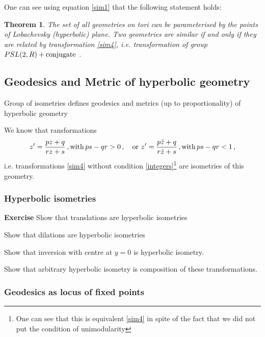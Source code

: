 \documentclass[12pt]{article}
\newtheorem{theorem}{Theorem}
\theoremstyle{definition}
\numberwithin{equation}{section}
\begin{document}
 One can see using equation \eqref{sim1}
that the following statement holds:


\begin{theorem}
The set of all geometries on tori 
can be parameterised by the points 
of Lobachevsky (hyperbolic) plane.
 Two geometries are similar if and only if
they are related by transformation
\eqref{sim4}, i.e. transformation of
 group $PSL(2,R)+{\rm conjugate}$ . 
\end{theorem}


\subsection {Geodesics and Metric of hyperbolic geometry}


  Group of isometries defines geodesics and metrics
(up to proportionality) of hyperbolic geometry

 We know that ransformations 
  \begin{equation}\label{hypisometry}
 z'={pz+q\over rz+s}\,,{\rm with}\,
      ps-qr>0\,,
   \quad {\rm or}\,\,
   z'={p\bar z+q\over r\bar z+s}\,,{\rm with}\,
      ps-qr<1\,,
 \end{equation}
i.e. transformations \eqref{sim4} without
condition \eqref{integers}\footnote{One can see that
this is equivalent \eqref{sim4} in spite of the fact that
we did not put the condition of unimodularity} 
are isometries of this geometry. 
\m

\subsubsection{Hyperbolic isometries}\label{exercises}


{\bf Exercise} Show that translations
are hyperbolic isometries


\smallskip

 Show that dilations 
are hyperbolic isometries


\smallskip


  Show that inversion with 
centre at $y=0$ is hyperbolic isometry. 


\smallskip

  Show that arbitrary
hyperbolic isometry is composition of these transformations. 



\subsubsection {Geodesics as locus of fixed points}
\end{document}
